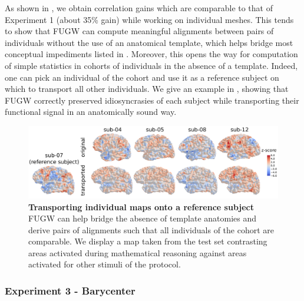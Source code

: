 As shown in ,
we obtain correlation gains which are comparable to that of Experiment 1 (about 35\% gain)
while working on individual meshes.
This tends to show that FUGW can compute meaningful alignments between pairs of individuals
without the use of an anatomical template, which helps bridge most conceptual impediments listed
in .
Moreover, this opens the way for computation of simple statistics in cohorts of individuals
in the absence of a template. Indeed, one can pick an individual of the cohort and use it
as a reference subject on which to transport all other individuals.
We give an example in ,
showing that FUGW correctly preserved idiosyncrasies of each subject while
transporting their functional signal in an anatomically sound way.
\begin{figure}[H]
    \centering
    \includegraphics[width=1\columnwidth]{./Chapitre4/figures/individual_alignment.pdf}
    \caption{
        \textbf{Transporting individual maps onto a reference subject}
        FUGW can help bridge the absence of template anatomies
        and derive pairs of alignments such that all individuals
        of the cohort are comparable. We display a map taken from the test set contrasting areas activated during mathematical reasoning against areas activated for other stimuli of the protocol.
    }
    \label{fig:individual_projections}
\end{figure}

\subsubsection{Experiment 3 - Barycenter}

